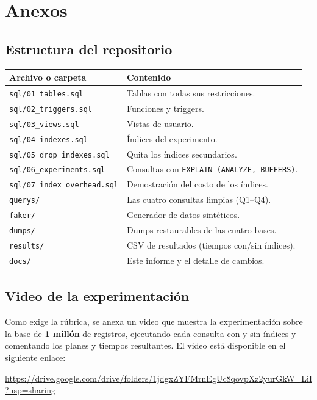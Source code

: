 \documentclass[12pt,a4paper]{article}
\begin{document}
\section{Anexos}

\subsection{Estructura del repositorio}

\begin{center}
\begin{tabular}{ll}
\toprule
\textbf{Archivo o carpeta} & \textbf{Contenido} \\
\midrule
\texttt{sql/01\_tables.sql}          & Tablas con todas sus restricciones. \\
\texttt{sql/02\_triggers.sql}        & Funciones y triggers. \\
\texttt{sql/03\_views.sql}           & Vistas de usuario. \\
\texttt{sql/04\_indexes.sql}         & Índices del experimento. \\
\texttt{sql/05\_drop\_indexes.sql}   & Quita los índices secundarios. \\
\texttt{sql/06\_experiments.sql}     & Consultas con \texttt{EXPLAIN (ANALYZE, BUFFERS)}. \\
\texttt{sql/07\_index\_overhead.sql} & Demostración del costo de los índices. \\
\texttt{querys/}                     & Las cuatro consultas limpias (Q1--Q4). \\
\texttt{faker/}                      & Generador de datos sintéticos. \\
\texttt{dumps/}                      & Dumps restaurables de las cuatro bases. \\
\texttt{results/}                    & CSV de resultados (tiempos con/sin índices). \\
\texttt{docs/}                       & Este informe y el detalle de cambios. \\
\bottomrule
\end{tabular}
\end{center}



\subsection{Video de la experimentación}

Como exige la rúbrica, se anexa un video que muestra la experimentación sobre la
base de \textbf{1 millón} de registros, ejecutando cada consulta con y sin
índices y comentando los planes y tiempos resultantes. El video está disponible
en el siguiente enlace:

\begin{center}
\url{https://drive.google.com/drive/folders/1jdgxZYFMrnEgUc8qovpXz2yurGkW_LiI?usp=sharing}
\end{center}
\end{document}
